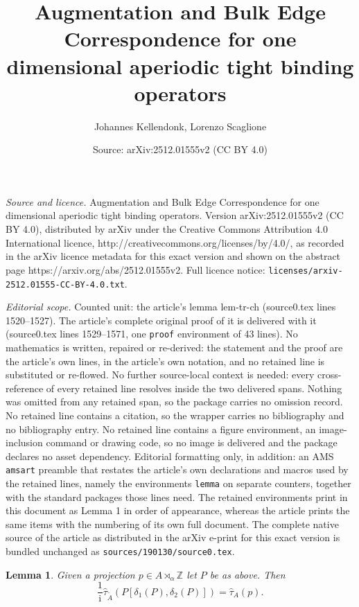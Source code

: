 \documentclass[10pt,a4paper]{amsart}
\title{Augmentation and Bulk Edge Correspondence for one dimensional aperiodic tight binding operators}
\author{Johannes Kellendonk, Lorenzo Scaglione}
\date{Source: arXiv:2512.01555v2 (CC BY 4.0)}
\newtheorem{lemma}{Lemma}
\begin{document}
\maketitle

\noindent\emph{Source and licence.} Augmentation and Bulk Edge Correspondence for one dimensional aperiodic tight binding operators. Version arXiv:2512.01555v2 (CC BY 4.0), distributed by arXiv under the Creative Commons Attribution 4.0 International licence, http://creativecommons.org/licenses/by/4.0/, as recorded in the arXiv licence metadata for this exact version and shown on the abstract page https://arxiv.org/abs/2512.01555v2. Full licence notice: \texttt{licenses/arxiv-2512.01555-CC-BY-4.0.txt}.\par\smallskip

\noindent\textit{Editorial scope.} Counted unit: the article's lemma lem-tr-ch (source0.tex lines 1520--1527). The article's complete original proof of it is delivered with it (source0.tex lines 1529--1571, one \texttt{proof} environment of 43 lines). No mathematics is written, repaired or re-derived: the statement and the proof are the article's own lines, in the article's own notation, and no retained line is substituted or re-flowed.  No further source-local context is needed: every cross-reference of every retained line resolves inside the two delivered spans.  Nothing was omitted from any retained span, so the package carries no omission record.  No retained line contains a citation, so the wrapper carries no bibliography and no bibliography entry.  No retained line contains a figure environment, an image-inclusion command or drawing code, so no image is delivered and the package declares no asset dependency.  Editorial formatting only, in addition: an AMS \texttt{amsart} preamble that restates the article's own declarations and macros used by the retained lines, namely the environments \texttt{lemma} on separate counters, together with the standard packages those lines need.  The retained environments print in this document as Lemma 1 in order of appearance, whereas the article prints the same items with the numbering of its own full document.  The complete native source of the article as distributed in the arXiv e-print for this exact version is bundled unchanged as \texttt{sources/190130/source0.tex}.
\begin{lemma}\label{lem-tr-ch}
Given a projection $p\in A \rtimes_\alpha \mathbb{Z}$ let $P$ be as above.
Then 
\begin{equation}\label{eq-tr-ch}
\frac1{\mathrm{i}}\hat{\tau}_{\tilde{A}}(P[\delta_1(P), \delta_2(P)])
=\hat{\tau}_A(p).
\end{equation}
\end{lemma}
\end{document}
